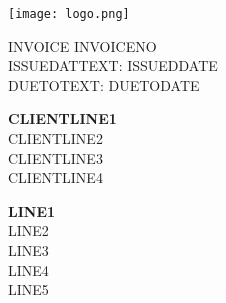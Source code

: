 \documentclass[a4paper]{article}
\begin{document}
    \noindent
    \begin{minipage}[t]{0.35\textwidth}
        {\texttt{[image: logo.png]}}
        {}
    \end{minipage}
    \hfill
    \begin{minipage}[b]{0.6\textwidth}
        \begin{flushright}
            \huge{INVOICE INVOICENO} \\[10pt]
            \normalsize{ISSUEDATTEXT: ISSUEDDATE} \\
            \normalsize{DUETOTEXT: DUETODATE}
        \end{flushright}
    \end{minipage}

    \vspace*{50pt} %
    \noindent
    \begin{minipage}[t]{0.3\textwidth}
        \vspace{0pt} %
        \begin{flushleft}
            \normalsize{\textbf{CLIENTLINE1}} \\
            \normalsize{CLIENTLINE2} \\
            \normalsize{CLIENTLINE3} \\
            \normalsize{CLIENTLINE4} \\
        \end{flushleft}
    \end{minipage}
    \hfill
    \begin{minipage}[t]{0.5\textwidth}
        \vspace{0pt} %
        \begin{flushright}
            \normalsize{\textbf{LINE1}} \\
            \normalsize{LINE2} \\
            \normalsize{LINE3} \\
            \normalsize{LINE4} \\
            \normalsize{LINE5}
        \end{flushright}
    \end{minipage}
\end{document}
